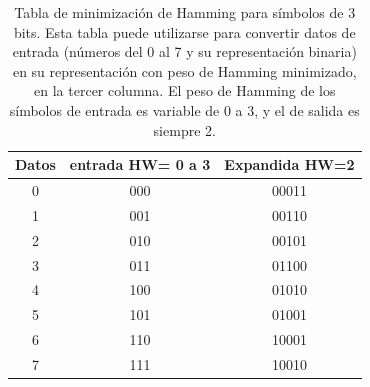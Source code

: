 \begin{table}[t]
\begin{center}
\begin{tabular}{c c c}
Datos & entrada HW= 0 a 3 & Expandida HW=2\\
\hline\hline
0 & 000 & 00011\\
1 & 001 & 00110\\
2 & 010 & 00101\\
3 & 011 & 01100\\
4 & 100 & 01010\\
5 & 101 & 01001\\
6 & 110 & 10001\\
7 & 111 & 10010\\
\end{tabular}
\caption{Tabla de minimización de Hamming para símbolos de 3 bits. Esta tabla puede utilizarse para convertir datos de entrada (números del 0 al 7 y su representación binaria) en su representación con peso de Hamming minimizado, en la tercer columna. El peso de Hamming de los símbolos de entrada es variable de 0 a 3, y el de salida es siempre 2.}
\label{hwtable}
\end{center}
 \end{table}
 

